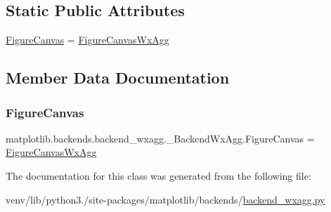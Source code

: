 \subsection*{Static Public Attributes}
\begin{DoxyCompactItemize}
\item 
\hyperlink{classmatplotlib_1_1backends_1_1backend__wxagg_1_1__BackendWxAgg_acda87731ef77790a72956af2f67d0e42}{Figure\+Canvas} = \hyperlink{classmatplotlib_1_1backends_1_1backend__wxagg_1_1FigureCanvasWxAgg}{Figure\+Canvas\+Wx\+Agg}
\end{DoxyCompactItemize}


\subsection{Member Data Documentation}
\mbox{\label{classmatplotlib_1_1backends_1_1backend__wxagg_1_1__BackendWxAgg_acda87731ef77790a72956af2f67d0e42}} 
\subsubsection{\texorpdfstring{Figure\+Canvas}{FigureCanvas}}
{\footnotesize\ttfamily matplotlib.\+backends.\+backend\+\_\+wxagg.\+\_\+\+Backend\+Wx\+Agg.\+Figure\+Canvas = \hyperlink{classmatplotlib_1_1backends_1_1backend__wxagg_1_1FigureCanvasWxAgg}{Figure\+Canvas\+Wx\+Agg}\hspace{0.3cm}{\ttfamily [static]}}



The documentation for this class was generated from the following file\+:\begin{DoxyCompactItemize}
\item 
venv/lib/python3./site-\/packages/matplotlib/backends/\hyperlink{backend__wxagg_8py}{backend\+\_\+wxagg.\+py}\end{DoxyCompactItemize}
